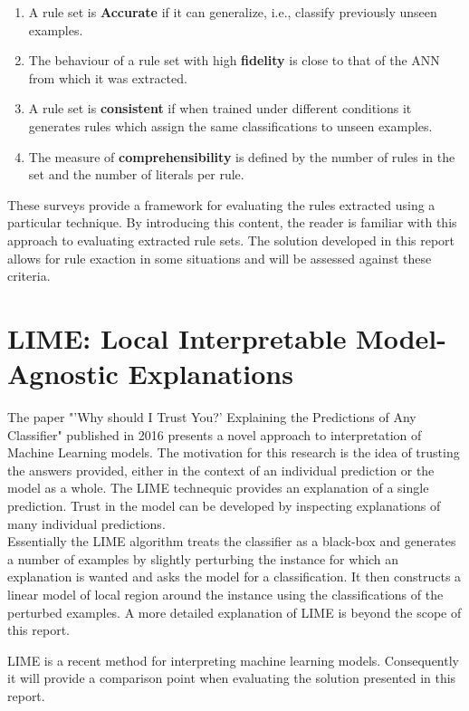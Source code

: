 \begin{enumerate}
\item A rule set is \textbf{Accurate} if it can generalize, i.e., classify previously unseen examples.
\item The behaviour of a rule set with high \textbf{fidelity} is close to that of the ANN from which it was extracted.
\item A rule set is \textbf{consistent} if when trained under different conditions it generates rules which assign the same classifications to unseen examples.
\item The measure of \textbf{comprehensibility} is defined by the number of rules in the set and the number of literals per rule.
\end{enumerate}

These surveys provide a framework for evaluating the rules extracted using a particular technique. By introducing this content, the reader is familiar with this approach to evaluating extracted rule sets. The solution developed in this report allows for rule exaction in some situations and will be assessed against these criteria. 

\section{LIME: Local Interpretable Model-Agnostic Explanations}
The paper "'Why should I Trust You?' Explaining the Predictions of Any Classifier" \cite{ribeiro2016should} published in 2016 presents a novel approach to interpretation of Machine Learning models. The motivation for this research is the idea of trusting the answers provided, either in the context of an individual prediction or the model as a whole. The LIME technequic provides an explanation of a single prediction. Trust in the model can be developed by inspecting explanations of many individual predictions.\\

Essentially the LIME algorithm treats the classifier as a black-box and generates a number of examples by slightly perturbing the instance for which an explanation is wanted and asks the model for a classification. It then constructs a linear model of local region around the instance using the classifications of the perturbed examples. A more detailed explanation of LIME is beyond the scope of this report.

LIME is a recent method for interpreting machine learning models. Consequently it will provide a comparison point when evaluating the solution presented in this report.

